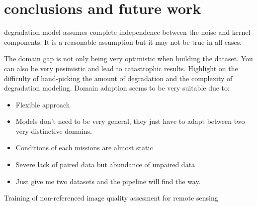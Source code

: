 \section{conclusions and future work}


degradation model assumes complete independence between the noise and kernel components. It is a reasonable assumption but it may not be true in all cases.

The domain gap is not only being very optimistic when building the dataset. 
You can also be very pesimistic and lead to catastrophic results.
Highlight on the difficulty of hand-picking the amount of degradation and the complexity of degradation modeling.
Domain adaption seems to be very suitable due to: 

\begin{itemize}
    \item Flexible approach
    \item Models don't need to be very general, they just have to adapt between two very distinctive domains.
    \item Conditions of each missions are almost static
    \item Severe lack of paired data but abundance of unpaired data
    \item Just give me two datasets and the pipeline will find the way.
\end{itemize}


Training of non-referenced image quality assesment for remote sensing